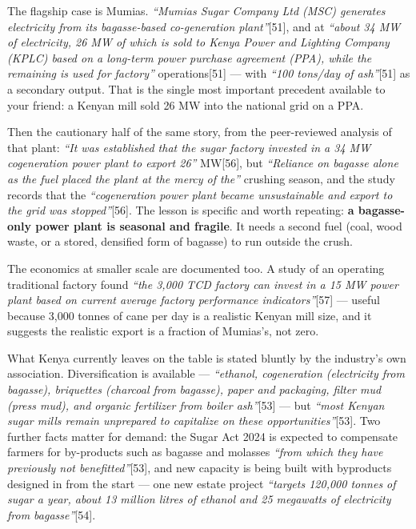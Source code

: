 \documentclass[11pt]{article}
\newcommand{\src}[1]{[#1]}
\begin{document}
The flagship case is Mumias. \emph{``Mumias Sugar Company Ltd (MSC) generates
electricity from its bagasse-based co-generation plant''}\src{51}, and at
\emph{``about 34 MW of electricity, 26 MW of which is sold to Kenya Power and
Lighting Company (KPLC) based on a long-term power purchase agreement (PPA),
while the remaining is used for factory''} operations\src{51} --- with
\emph{``100 tons/day of ash''}\src{51} as a secondary output. That is the
single most important precedent available to your friend: a Kenyan mill sold
26 MW into the national grid on a PPA.

Then the cautionary half of the same story, from the peer-reviewed analysis of
that plant: \emph{``It was established that the sugar factory invested in a 34
MW cogeneration power plant to export 26''} MW\src{56}, but \emph{``Reliance on
bagasse alone as the fuel placed the plant at the mercy of the''} crushing
season, and the study records that the \emph{``cogeneration power plant became
unsustainable and export to the grid was stopped''}\src{56}. The lesson is
specific and worth repeating: \textbf{a bagasse-only power plant is seasonal
and fragile}. It needs a second fuel (coal, wood waste, or a stored,
densified form of bagasse) to run outside the crush.

The economics at smaller scale are documented too. A study of an operating
traditional factory found \emph{``the 3,000 TCD factory can invest in a 15 MW
power plant based on current average factory performance indicators''}\src{57}
--- useful because 3{,}000 tonnes of cane per day is a realistic Kenyan mill
size, and it suggests the realistic export is a fraction of Mumias's, not zero.

What Kenya currently leaves on the table is stated bluntly by the industry's
own association. Diversification is available --- \emph{``ethanol, cogeneration
(electricity from bagasse), briquettes (charcoal from bagasse), paper and
packaging, filter mud (press mud), and organic fertilizer from boiler
ash''}\src{53} --- but \emph{``most Kenyan sugar mills remain unprepared to
capitalize on these opportunities''}\src{53}. Two further facts matter for
demand: the Sugar Act 2024 is expected to compensate farmers for by-products
such as bagasse and molasses \emph{``from which they have previously not
benefitted''}\src{53}, and new capacity is being built with byproducts designed
in from the start --- one new estate project \emph{``targets 120,000 tonnes of
sugar a year, about 13 million litres of ethanol and 25 megawatts of
electricity from bagasse''}\src{54}.
\end{document}
